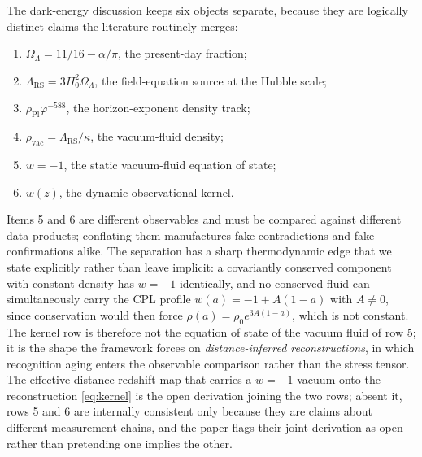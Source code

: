 \documentclass[11pt,letterpaper]{article}
\begin{document}
The dark-energy discussion keeps six objects separate, because they are logically distinct claims the literature routinely merges:
\begin{enumerate}
\item $\Omega_{\Lambda}=11/16-\alpha/\pi$, the present-day fraction;
\item $\Lambda_{\mathrm{RS}}=3H_{0}^{2}\Omega_{\Lambda}$, the field-equation source at the Hubble scale;
\item $\rho_{\mathrm{Pl}}\varphi^{-588}$, the horizon-exponent density track;
\item $\rho_{\mathrm{vac}}=\Lambda_{\mathrm{RS}}/\kappa$, the vacuum-fluid density;
\item $w=-1$, the static vacuum-fluid equation of state;
\item $w(z)$, the dynamic observational kernel.
\end{enumerate}
Items 5 and 6 are different observables and must be compared against different data products; conflating them manufactures fake contradictions and fake confirmations alike. The separation has a sharp thermodynamic edge that we state explicitly rather than leave implicit: a covariantly conserved component with constant density has $w=-1$ identically, and no conserved fluid can simultaneously carry the CPL profile $w(a)=-1+A(1-a)$ with $A\neq 0$, since conservation would then force $\rho(a)=\rho_{0}e^{3A(1-a)}$, which is not constant. The kernel row is therefore not the equation of state of the vacuum fluid of row 5; it is the shape the framework forces on \emph{distance-inferred reconstructions}, in which recognition aging enters the observable comparison rather than the stress tensor. The effective distance-redshift map that carries a $w=-1$ vacuum onto the reconstruction \eqref{eq:kernel} is the open derivation joining the two rows; absent it, rows 5 and 6 are internally consistent only because they are claims about different measurement chains, and the paper flags their joint derivation as open rather than pretending one implies the other.
\end{document}
